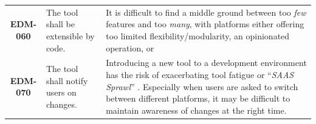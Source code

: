 \documentclass[a4paper,nobib,justified,final]{tufte-book}
\begin{document}
\begin{table}[h]
\begin{tabularx}{\textwidth}{cp{4cm}X}
		\\
		\textbf{EDM-060} & The tool shall be extensible by code.
		&   
		It is difficult to find a middle ground between too \emph{few} features and too \emph{many}, with platforms either offering too limited flexibility/modularity, an opinionated operation, or 
				
		
		
		
		
		\\
		\textbf{EDM-070} & The tool shall notify users on changes.
		&     Introducing a new tool to a development environment has the risk of exacerbating tool fatigue or ``\emph{\acs{SAAS} Sprawl}'' \cite{goodwinWhatSaaSSprawl2025}. Especially when users are asked to switch between different platforms, it may be difficult to maintain awareness of changes at the right time.
		

\end{tabularx}
\end{table}
\end{document}
